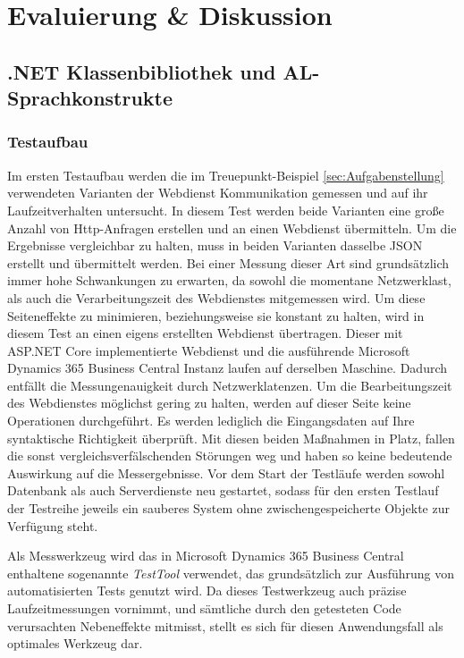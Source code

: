 \chapter{Evaluierung \& Diskussion}
\label{cha:Tests und Evaluierung}

\section{.NET Klassenbibliothek und AL-Sprachkonstrukte}
\subsection{Testaufbau}
Im ersten Testaufbau werden die im Treuepunkt-Beispiel \ref{sec:Aufgabenstellung} verwendeten Varianten der Webdienst Kommunikation gemessen und auf ihr Laufzeitverhalten untersucht. In diesem Test werden beide Varianten eine große Anzahl von Http-Anfragen erstellen und an einen Webdienst übermitteln. Um die Ergebnisse vergleichbar zu halten, muss in beiden Varianten dasselbe JSON erstellt und übermittelt werden. Bei einer Messung dieser Art sind grundsätzlich immer hohe Schwankungen zu erwarten, da sowohl die momentane Netzwerklast, als auch die Verarbeitungszeit des Webdienstes mitgemessen wird. Um diese Seiteneffekte zu minimieren, beziehungsweise sie konstant zu halten, wird in diesem Test an einen eigens erstellten Webdienst übertragen. Dieser mit ASP.NET Core implementierte Webdienst und die ausführende Microsoft Dynamics 365 Business Central Instanz laufen auf derselben Maschine. Dadurch entfällt die Messungenauigkeit durch Netzwerklatenzen. Um die Bearbeitungszeit des Webdienstes möglichst gering zu halten, werden auf dieser Seite keine Operationen durchgeführt. Es werden lediglich die Eingangsdaten auf Ihre syntaktische Richtigkeit überprüft. Mit diesen beiden Maßnahmen in Platz, fallen die sonst vergleichsverfälschenden Störungen weg und haben so keine bedeutende Auswirkung auf die Messergebnisse. Vor dem Start der Testläufe werden sowohl Datenbank als auch Serverdienste neu gestartet, sodass für den ersten Testlauf der Testreihe jeweils ein sauberes System ohne zwischengespeicherte Objekte zur Verfügung steht.

Als Messwerkzeug wird das in Microsoft Dynamics 365 Business Central enthaltene sogenannte \textit{TestTool} verwendet, das grundsätzlich zur Ausführung von automatisierten Tests genutzt wird. Da dieses Testwerkzeug auch präzise Laufzeitmessungen vornimmt, und sämtliche durch den getesteten Code verursachten Nebeneffekte mitmisst, stellt es sich für diesen Anwendungsfall als optimales Werkzeug dar.
\pagebreak

